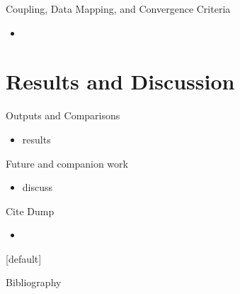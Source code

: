 \documentclass[9pt,t]{beamer}
\makeatletter
\newenvironment{withoutheadline}{
       \setbeamertemplate{headline}[default]
       \def\beamer@entrycode{\vspace*{-\headheight}}
    }{}
\makeatother
\begin{document}
\begin{frame}{Coupling, Data Mapping, and Convergence Criteria}
    \begin{itemize}
        \item
    \end{itemize}
\end{frame}


\section{Results and Discussion}
\begin{frame}{Outputs and Comparisons}
    \begin{itemize}
        \item results
    \end{itemize}
\end{frame}

\begin{frame}{Future and companion work}
    \begin{itemize}
        \item discuss
    \end{itemize}
\end{frame}


\begin{frame}{Cite Dump}
    \begin{itemize}
        \item \cite{aya2023} \cite{brown-entropy-2006} \cite{dufek} \cite{lindsay2022moose} \cite{nekrs} \cite{novak-2023} \cite{novak2022-cardinal} \cite{openmc}
    \end{itemize}
\end{frame}

\begin{withoutheadline}
\begin{frame}[allowframebreaks]{Bibliography}
    \printbibliography
\end{frame}
\end{withoutheadline}
\end{document}
